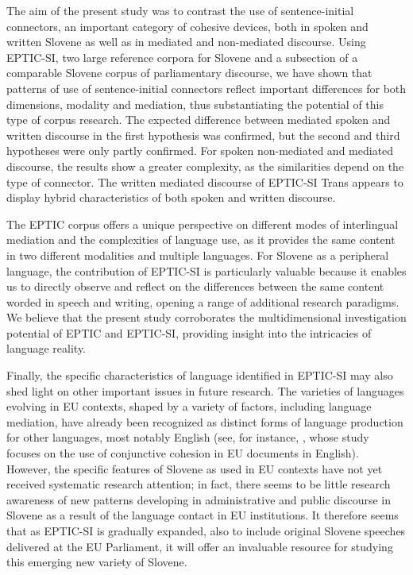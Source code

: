 \documentclass[output=paper]{langscibook}
\begin{document}
The aim of the present study was to contrast the use of sentence-initial connectors, an important category of cohesive devices, both in spoken and written Slovene as well as in mediated and non-mediated discourse. Using EPTIC-SI, two large reference corpora for Slovene and a subsection of a comparable Slovene corpus of parliamentary discourse, we have shown that patterns of use of sentence-initial connectors reflect important differences for both dimensions, modality and mediation, thus substantiating the potential of this type of corpus research. The expected difference between mediated spoken and written discourse in the first hypothesis was confirmed, but the second and third hypotheses were only partly confirmed. For spoken non-mediated and mediated discourse, the results show a greater complexity, as the similarities depend on the type of connector. The written mediated discourse of EPTIC-SI Trans appears to display hybrid characteristics of both spoken and written discourse.

The EPTIC corpus offers a unique perspective on different modes of interlingual mediation and the complexities of language use, as it provides the same content in two different modalities and multiple languages. For Slovene as a peripheral language, the contribution of EPTIC-SI is particularly valuable because it enables us to directly observe and reflect on the differences between the same content worded in speech and writing, opening a range of additional research paradigms. We believe that the present study corroborates the multidimensional investigation potential of EPTIC and EPTIC-SI, providing insight into the intricacies of language reality.

Finally, the specific characteristics of language identified in EPTIC-SI may also shed light on other important issues in future research. The varieties of languages evolving in EU contexts, shaped by a variety of factors, including language mediation, have already been recognized as distinct forms of language production for other languages, most notably English (see, for instance, \citealt{Trebits2009}, whose study focuses on the use of conjunctive cohesion in EU documents in English). However, the specific features of Slovene as used in EU contexts have not yet received systematic research attention; in fact, there seems to be little research awareness of new patterns developing in administrative and public discourse in Slovene as a result of the language contact in EU institutions. It therefore seems that as EPTIC-SI is gradually expanded, also to include original Slovene speeches delivered at the EU Parliament, it will offer an invaluable resource for studying this emerging new variety of Slovene.
\end{document}
